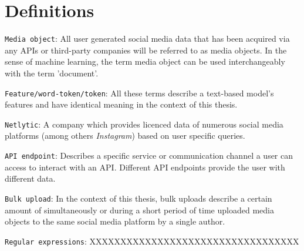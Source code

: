 \section*{Definitions} \label{definitions}
\texttt{Media object}: All user generated social media data that has been acquired via any APIs or third-party companies will be referred to as media objects. In the sense of machine learning, the term media object can be used interchangeably with the term 'document'.
\newline

\texttt{Feature/word-token/token}: All these terms describe a text-based model's features and have identical meaning in the context of this thesis.
\newline

\texttt{Netlytic}: A company which provides licenced data of numerous social media platforms (among others \textit{Instagram}) based on user specific queries.
\newline

\texttt{API endpoint}: Describes a specific service or communication channel a user can access to interact with an API. Different API endpoints provide the user with different data.
\newline

\texttt{Bulk upload}: In the context of this thesis, bulk uploads describe a certain amount of simultaneously or during a short period of time uploaded media objects to the same social media platform by a single author.
\newline

\texttt{Regular expressions}: XXXXXXXXXXXXXXXXXXXXXXXXXXXXXXXXXX




 \cleardoublepage

